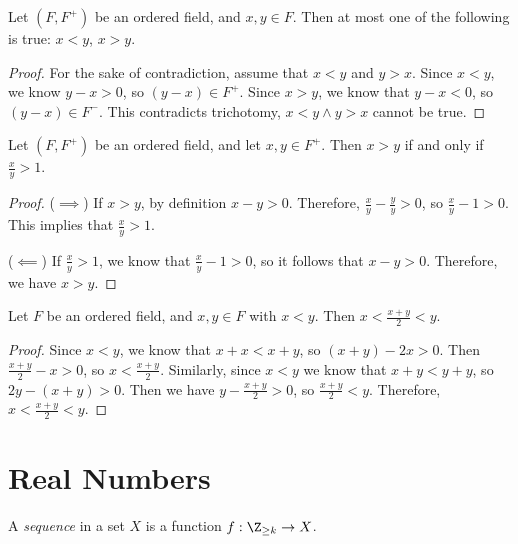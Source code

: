 \documentclass[12pt]{article}
\begin{document}
\begin{prop}\label{trichotomy-exclusion}
    Let $(F, F^+)$ be an ordered field, and $x, y \in F$. Then at most one of the following is true: $x < y$, $x > y$.
\end{prop}

\begin{proof}
    For the sake of contradiction, assume that $x < y$ and $y > x$. Since $x < y$, we know $y - x > 0$, so $(y - x) \in F^+$. Since $x > y$, we know that $y - x < 0$, so $(y - x) \in F^-$. This contradicts trichotomy, $x < y \land y > x$ cannot be true.
\end{proof}

\begin{prop}\label{greater-than-ratio}
    Let $(F, F^+)$ be an ordered field, and let $x, y \in F^{+}$. Then $x > y$ if and only if $\frac{x}{y} > 1$.
\end{prop}

\begin{proof}\proofbreak
    ($\implies$) If $x > y$, by definition $x - y > 0$. Therefore, $\frac{x}{y} - \frac{y}{y} > 0$, so $\frac{x}{y} - 1 > 0$. This implies that $\frac{x}{y} > 1$.

    ($\impliedby$) If $\frac{x}{y} > 1$, we know that $\frac{x}{y} - 1 > 0$, so it follows that $x - y > 0$. Therefore, we have $x > y$.
\end{proof}

\begin{prop}\label{average-in-between}
    Let $F$ be an ordered field, and $x, y \in F$ with $x < y$. Then $x < \frac{x+y}{2} < y$.
\end{prop}

\begin{proof}
    Since $x < y$, we know that $x + x < x + y$, so $(x + y) - 2x > 0$. Then $\frac{x+y}{2} - x > 0$, so $x < \frac{x+y}{2}$. Similarly, since $x < y$ we know that $x + y < y + y$, so $2y - (x + y) > 0$. Then we have $y - \frac{x + y}{2} > 0$, so $\frac{x + y}{2} < y$. Therefore, $x < \frac{x+y}{2} < y$.
\end{proof}

\section{Real Numbers}

\begin{defn}
    A \emph{sequence} in a set $X$ is a function $f: \Z_{\geq k} \to X$.
\end{defn}
\end{document}
